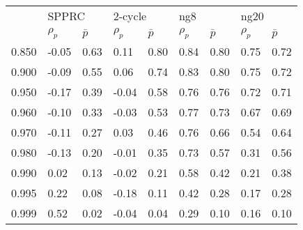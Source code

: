 \begin{tabular}{lllllllll}
\toprule
{} & \multicolumn{2}{l}{SPPRC} & \multicolumn{2}{l}{2-cycle} & \multicolumn{2}{l}{ng8} & \multicolumn{2}{l}{ng20} \\
{} & $\rho_p$ & $\bar p$ & $\rho_p$ & $\bar p$ & $\rho_p$ & $\bar p$ & $\rho_p$ & $\bar p$ \\
\midrule
0.850 &    -0.05 &     0.63 &     0.11 &     0.80 &     0.84 &     0.80 &     0.75 &     0.72 \\
0.900 &    -0.09 &     0.55 &     0.06 &     0.74 &     0.83 &     0.80 &     0.75 &     0.72 \\
0.950 &    -0.17 &     0.39 &    -0.04 &     0.58 &     0.76 &     0.76 &     0.72 &     0.71 \\
0.960 &    -0.10 &     0.33 &    -0.03 &     0.53 &     0.77 &     0.73 &     0.67 &     0.69 \\
0.970 &    -0.11 &     0.27 &     0.03 &     0.46 &     0.76 &     0.66 &     0.54 &     0.64 \\
0.980 &    -0.13 &     0.20 &    -0.01 &     0.35 &     0.73 &     0.57 &     0.31 &     0.56 \\
0.990 &     0.02 &     0.13 &    -0.02 &     0.21 &     0.58 &     0.42 &     0.21 &     0.38 \\
0.995 &     0.22 &     0.08 &    -0.18 &     0.11 &     0.42 &     0.28 &     0.17 &     0.28 \\
0.999 &     0.52 &     0.02 &    -0.04 &     0.04 &     0.29 &     0.10 &     0.16 &     0.10 \\
\bottomrule
\end{tabular}
